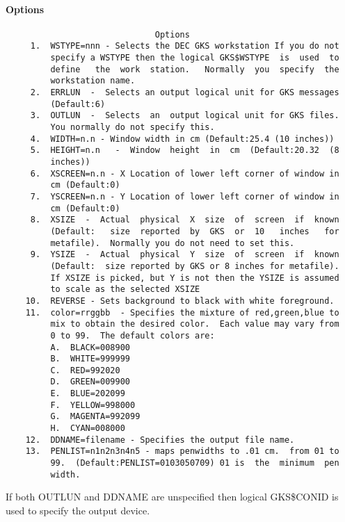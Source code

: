 \paragraph{Options}
\begin{verbatim}
                              Options
     1.  WSTYPE=nnn - Selects the DEC GKS workstation If you do not
         specify a WSTYPE then the logical GKS$WSTYPE  is  used  to
         define   the  work  station.   Normally  you  specify  the
         workstation name.  
     2.  ERRLUN  -  Selects an output logical unit for GKS messages
         (Default:6) 
     3.  OUTLUN  -  Selects  an  output logical unit for GKS files.
         You normally do not specify this.  
     4.  WIDTH=n.n - Window width in cm (Default:25.4 (10 inches)) 
     5.  HEIGHT=n.n   -  Window  height  in  cm  (Default:20.32  (8
         inches)) 
     6.  XSCREEN=n.n - X Location of lower left corner of window in
         cm (Default:0) 
     7.  YSCREEN=n.n - Y Location of lower left corner of window in
         cm (Default:0) 
     8.  XSIZE  -  Actual  physical  X  size  of  screen  if  known
         (Default:   size  reported  by  GKS  or  10   inches   for
         metafile).  Normally you do not need to set this.  
     9.  YSIZE  -  Actual  physical  Y  size  of  screen  if  known
         (Default:  size reported by GKS or 8 inches for metafile).
         If XSIZE is picked, but Y is not then the YSIZE is assumed
         to scale as the selected XSIZE 
    10.  REVERSE - Sets background to black with white foreground. 
    11.  color=rrggbb  - Specifies the mixture of red,green,blue to
         mix to obtain the desired color.  Each value may vary from
         0 to 99.  The default colors are:  
         A.  BLACK=008900 
         B.  WHITE=999999 
         C.  RED=992020 
         D.  GREEN=009900 
         E.  BLUE=202099 
         F.  YELLOW=998000 
         G.  MAGENTA=992099 
         H.  CYAN=008000 
    12.  DDNAME=filename - Specifies the output file name.  
    13.  PENLIST=n1n2n3n4n5 - maps penwidths to .01 cm.  from 01 to
         99.  (Default:PENLIST=0103050709) 01 is  the  minimum  pen
         width.  
\end{verbatim}
If both OUTLUN and DDNAME are unspecified then logical GKS\$CONID is
used to specify the output device.  

